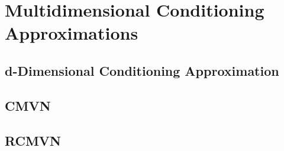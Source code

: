 \section{Multidimensional Conditioning Approximations}

\subsection{d-Dimensional Conditioning Approximation}

\subsection{CMVN}
\subsection{RCMVN}